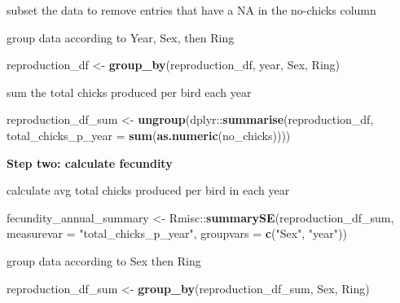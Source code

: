 \documentclass[]{article}
\newenvironment{Shaded}{\begin{snugshade}}{\end{snugshade}}
\newcommand{\KeywordTok}[1]{\textcolor[rgb]{0.13,0.29,0.53}{\textbf{{#1}}}}
\newcommand{\DataTypeTok}[1]{\textcolor[rgb]{0.13,0.29,0.53}{{#1}}}
\newcommand{\StringTok}[1]{\textcolor[rgb]{0.31,0.60,0.02}{{#1}}}
\newcommand{\NormalTok}[1]{{#1}}
\begin{document}
subset the data to remove entries that have a NA in the no-chicks column

\begin{Shaded}
\end{Shaded}

group data according to Year, Sex, then Ring

\begin{Shaded}
\begin{Highlighting}[]
\NormalTok{reproduction_df <-}\StringTok{ }\KeywordTok{group_by}\NormalTok{(reproduction_df, year, Sex, Ring)}
\end{Highlighting}
\end{Shaded}

sum the total chicks produced per bird each year

\begin{Shaded}
\begin{Highlighting}[]
\NormalTok{reproduction_df_sum <-}\StringTok{ }
\StringTok{  }\KeywordTok{ungroup}\NormalTok{(dplyr::}\KeywordTok{summarise}\NormalTok{(reproduction_df, }
                           \DataTypeTok{total_chicks_p_year =} \KeywordTok{sum}\NormalTok{(}\KeywordTok{as.numeric}\NormalTok{(no_chicks))))}
\end{Highlighting}
\end{Shaded}

\textbf{Step two: calculate fecundity}

calculate avg total chicks produced per bird in each year

\begin{Shaded}
\begin{Highlighting}[]
\NormalTok{fecundity_annual_summary <-}\StringTok{ }
\StringTok{  }\NormalTok{Rmisc::}\KeywordTok{summarySE}\NormalTok{(reproduction_df_sum, }\DataTypeTok{measurevar =} \StringTok{"total_chicks_p_year"}\NormalTok{, }
                   \DataTypeTok{groupvars =} \KeywordTok{c}\NormalTok{(}\StringTok{"Sex"}\NormalTok{, }\StringTok{"year"}\NormalTok{))}
\end{Highlighting}
\end{Shaded}

group data according to Sex then Ring

\begin{Shaded}
\begin{Highlighting}[]
\NormalTok{reproduction_df_sum <-}\StringTok{ }\KeywordTok{group_by}\NormalTok{(reproduction_df_sum, Sex, Ring)}
\end{Highlighting}
\end{Shaded}
\end{document}
